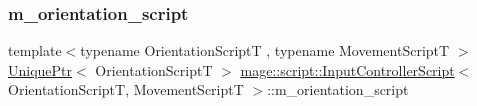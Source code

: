\subsubsection{\texorpdfstring{m\+\_\+orientation\+\_\+script}{m\_orientation\_script}}
{\footnotesize\ttfamily template$<$typename Orientation\+ScriptT , typename Movement\+ScriptT $>$ \\
\hyperlink{namespacemage_a3316d7143a973e37adf1110f2e80ca31}{Unique\+Ptr}$<$ Orientation\+ScriptT $>$ \hyperlink{classmage_1_1script_1_1_input_controller_script}{mage\+::script\+::\+Input\+Controller\+Script}$<$ Orientation\+ScriptT, Movement\+ScriptT $>$\+::m\+\_\+orientation\+\_\+script\hspace{0.3cm}{\ttfamily [private]}}

